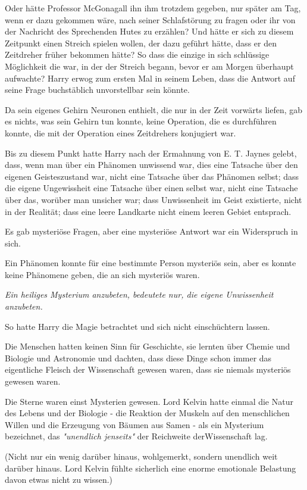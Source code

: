 {Oder hätte Professor McGonagall ihn ihm trotzdem gegeben, nur später am Tag, wenn er dazu gekommen wäre, nach seiner Schlafstörung zu fragen oder ihr von der Nachricht des Sprechenden Hutes zu erzählen? Und hätte er sich zu diesem Zeitpunkt einen Streich spielen wollen, der dazu geführt hätte, dass er den Zeitdreher früher bekommen hätte? So dass die einzige in sich schlüssige Möglichkeit die war, in der der Streich begann, bevor er am Morgen überhaupt aufwachte? Harry erwog zum ersten Mal in seinem Leben, dass die Antwort auf seine Frage buchstäblich unvorstellbar sein könnte.

Da sein eigenes Gehirn Neuronen enthielt, die nur in der Zeit vorwärts liefen, gab es nichts, was sein Gehirn tun konnte, keine Operation, die es durchführen konnte, die mit der Operation eines Zeitdrehers konjugiert war.

Bis zu diesem Punkt hatte Harry nach der Ermahnung von E. T. Jaynes gelebt, dass, wenn man über ein Phänomen unwissend war, dies eine Tatsache über den eigenen Geisteszustand war, nicht eine Tatsache über das Phänomen selbst; dass die eigene Ungewissheit eine Tatsache über einen selbst war, nicht eine Tatsache über das, worüber man unsicher war; dass Unwissenheit im Geist existierte, nicht in der Realität; dass eine leere Landkarte nicht einem leeren Gebiet entsprach.

Es gab mysteriöse Fragen, aber eine mysteriöse Antwort war ein Widerspruch in sich.

Ein Phänomen konnte für eine bestimmte Person mysteriös sein, aber es konnte keine Phänomene geben, die an sich mysteriös waren.

\emph{Ein heiliges Mysterium anzubeten, bedeutete nur, die eigene Unwissenheit anzubeten.}

So hatte Harry die Magie betrachtet und sich nicht einschüchtern lassen.

Die Menschen hatten keinen Sinn für Geschichte, sie lernten über Chemie und Biologie und Astronomie und dachten, dass diese Dinge schon immer das eigentliche Fleisch der Wissenschaft gewesen waren, dass sie niemals mysteriös gewesen waren.

Die Sterne waren einst Mysterien gewesen. Lord Kelvin hatte einmal die Natur des Lebens und der Biologie - die Reaktion der Muskeln auf den menschlichen Willen und die Erzeugung von Bäumen aus Samen - als ein Mysterium bezeichnet, das \emph{"unendlich jenseits"} der Reichweite derWissenschaft lag.

(Nicht nur ein wenig darüber hinaus, wohlgemerkt, sondern unendlich weit darüber hinaus. Lord Kelvin fühlte sicherlich eine enorme emotionale Belastung davon etwas nicht zu wissen.)

}
